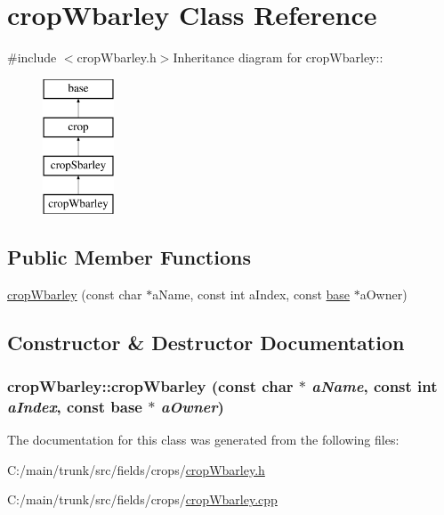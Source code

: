 \hypertarget{classcrop_wbarley}{
\section{cropWbarley Class Reference}
\label{classcrop_wbarley}
}


{\ttfamily \#include $<$cropWbarley.h$>$}Inheritance diagram for cropWbarley::\begin{figure}[H]
\begin{center}
\leavevmode
\includegraphics[height=4cm]{classcrop_wbarley}
\end{center}
\end{figure}
\subsection*{Public Member Functions}
\begin{DoxyCompactItemize}
\item 
\hyperlink{classcrop_wbarley_ace56e1c9cf7e0ec47abdf9f947694a01}{cropWbarley} (const char $\ast$aName, const int aIndex, const \hyperlink{classbase}{base} $\ast$aOwner)
\end{DoxyCompactItemize}


\subsection{Constructor \& Destructor Documentation}
\hypertarget{classcrop_wbarley_ace56e1c9cf7e0ec47abdf9f947694a01}{
\subsubsection[{cropWbarley}]{\setlength{\rightskip}{0pt plus 5cm}cropWbarley::cropWbarley (const char $\ast$ {\em aName}, \/  const int {\em aIndex}, \/  const {\bf base} $\ast$ {\em aOwner})}}
\label{classcrop_wbarley_ace56e1c9cf7e0ec47abdf9f947694a01}


The documentation for this class was generated from the following files:\begin{DoxyCompactItemize}
\item 
C:/main/trunk/src/fields/crops/\hyperlink{crop_wbarley_8h}{cropWbarley.h}\item 
C:/main/trunk/src/fields/crops/\hyperlink{crop_wbarley_8cpp}{cropWbarley.cpp}\end{DoxyCompactItemize}
